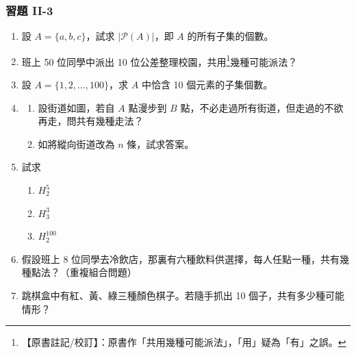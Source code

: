 \subsubsection*{習題 II-3}\label{sec:b5-ex2-3}

\begin{enumerate}[label=\textbf{\arabic*.}]
  \item 設 $A = \{a, b, c\}$，試求 $|\mathscr{P}(A)|$，即 $A$ 的所有子集的個數。
  \item 班上 50 位同學中派出 10 位公差整理校園，共用\label{note:b5-ch2-p83-gongyong}\footnote{【原書註記/校訂】：原書作「共用幾種可能派法」，「用」疑為「有」之誤。}幾種可能派法？
  \item 設 $A = \{1, 2, \ldots, 100\}$，求 $A$ 中恰含 10 個元素的子集個數。
  \item
  \begin{minipage}[t]{0.64\linewidth}
  \begin{enumerate}[label=(\arabic*)]
    \item 設街道如圖，若自 $A$ 點漫步到 $B$ 點，不必走過所有街道，但走過的不欲再走，問共有幾種走法？
    \item 如將縱向街道改為 $n$ 條，試求答案。
  \end{enumerate}
  \end{minipage}\hfill
  \begin{minipage}[t]{0.32\linewidth}
  \centering
  \vspace{0pt}
  \end{minipage}
  \item 試求
  \begin{enumerate}[label=(\arabic*)]
    \item $H_2^5$
    \item $H_3^3$
    \item $H_2^{100}$
  \end{enumerate}
  \item 假設班上 8 位同學去冷飲店，那裏有六種飲料供選擇，每人任點一種，共有幾種點法？（重複組合問題）
  \item 跳棋盒中有紅、黃、綠三種顏色棋子。若隨手抓出 10 個子，共有多少種可能情形？

\end{enumerate}
